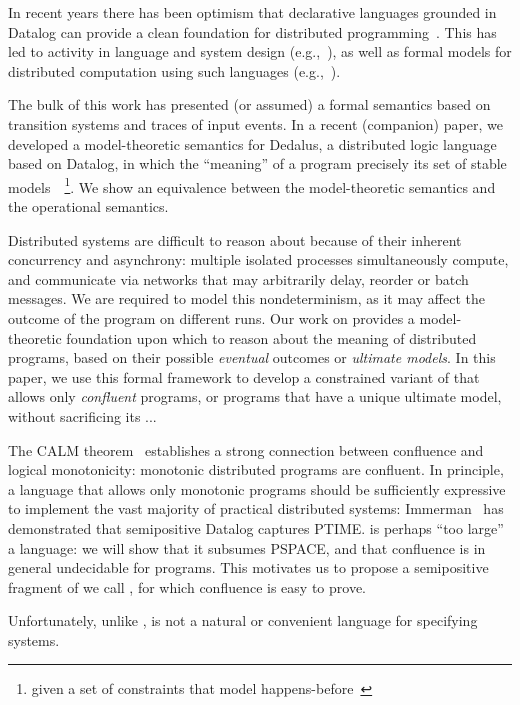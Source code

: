 In recent years there has been optimism that declarative languages grounded in
Datalog can provide a clean foundation for distributed
programming~\cite{declarative-imperative}.  This has led to activity in language
and system design (e.g.,~\cite{boom,Belaramani:2009,Chu:2007,Loo2009-CACM}), as well as formal
models for distributed computation using such
languages (e.g.,~\cite{relational-transducers,navarro-oper-sem,card-abstraction}).

The bulk of this work has presented (or assumed) a formal semantics based on transition systems
and traces of input events. 
In a recent (companion) paper, we developed a model-theoretic 
semantics for Dedalus, a distributed logic language based on Datalog, in which the ``meaning''
of a program precisely its set of stable models~\cite{zaniolo}~\footnote{given a set of constraints that 
model happens-before~\cite{lamport}}.  We show an equivalence between the model-theoretic semantics
and the operational semantics.

Distributed systems are difficult to reason about because of their inherent concurrency and asynchrony: multiple 
isolated processes simultaneously compute, and communicate via networks that may arbitrarily delay, reorder or batch messages.
We are required to model this nondeterminism, as it may affect the outcome of the program on different runs.  Our work on
\lang provides a model-theoretic foundation upon which to reason about the meaning of distributed programs, based on their possible 
\emph{eventual} outcomes or \emph{ultimate models}.  In this paper, we use this formal framework to develop a constrained variant
of \lang that allows only \emph{confluent} programs, or programs that have a unique ultimate model, without sacrificing its ...

The CALM theorem~\cite{calm, ameloot, imperative, ameloot} establishes a strong connection between confluence
and logical monotonicity: monotonic distributed programs are confluent.  In principle, a language that allows only
monotonic programs should be sufficiently expressive to implement the vast majority of practical distributed systems:
Immerman~\cite{??} has demonstrated that semipositive Datalog captures PTIME.  
\lang is perhaps ``too large'' a language: we will show that it subsumes PSPACE, and that confluence is in general
undecidable for \lang programs.  This motivates us to propose a semipositive fragment of \lang we call \slang, 
for which confluence is easy to prove.

Unfortunately, unlike \lang, \slang is not a natural or convenient language for specifying systems.  
